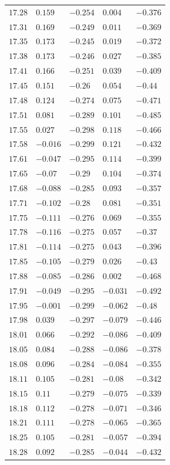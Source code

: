 \begin{center}
\begin{longtable}{lllll}
$17.28$&$0.159$&$-0.254$&$0.004$&$-0.376$\\
$17.31$&$0.169$&$-0.249$&$0.011$&$-0.369$\\
$17.35$&$0.173$&$-0.245$&$0.019$&$-0.372$\\
$17.38$&$0.173$&$-0.246$&$0.027$&$-0.385$\\
$17.41$&$0.166$&$-0.251$&$0.039$&$-0.409$\\
$17.45$&$0.151$&$-0.26$&$0.054$&$-0.44$\\
$17.48$&$0.124$&$-0.274$&$0.075$&$-0.471$\\
$17.51$&$0.081$&$-0.289$&$0.101$&$-0.485$\\
$17.55$&$0.027$&$-0.298$&$0.118$&$-0.466$\\
$17.58$&$-0.016$&$-0.299$&$0.121$&$-0.432$\\
$17.61$&$-0.047$&$-0.295$&$0.114$&$-0.399$\\
$17.65$&$-0.07$&$-0.29$&$0.104$&$-0.374$\\
$17.68$&$-0.088$&$-0.285$&$0.093$&$-0.357$\\
$17.71$&$-0.102$&$-0.28$&$0.081$&$-0.351$\\
$17.75$&$-0.111$&$-0.276$&$0.069$&$-0.355$\\
$17.78$&$-0.116$&$-0.275$&$0.057$&$-0.37$\\
$17.81$&$-0.114$&$-0.275$&$0.043$&$-0.396$\\
$17.85$&$-0.105$&$-0.279$&$0.026$&$-0.43$\\
$17.88$&$-0.085$&$-0.286$&$0.002$&$-0.468$\\
$17.91$&$-0.049$&$-0.295$&$-0.031$&$-0.492$\\
$17.95$&$-0.001$&$-0.299$&$-0.062$&$-0.48$\\
$17.98$&$0.039$&$-0.297$&$-0.079$&$-0.446$\\
$18.01$&$0.066$&$-0.292$&$-0.086$&$-0.409$\\
$18.05$&$0.084$&$-0.288$&$-0.086$&$-0.378$\\
$18.08$&$0.096$&$-0.284$&$-0.084$&$-0.355$\\
$18.11$&$0.105$&$-0.281$&$-0.08$&$-0.342$\\
$18.15$&$0.11$&$-0.279$&$-0.075$&$-0.339$\\
$18.18$&$0.112$&$-0.278$&$-0.071$&$-0.346$\\
$18.21$&$0.111$&$-0.278$&$-0.065$&$-0.365$\\
$18.25$&$0.105$&$-0.281$&$-0.057$&$-0.394$\\
$18.28$&$0.092$&$-0.285$&$-0.044$&$-0.432$\\

\end{longtable}
\end{center}
